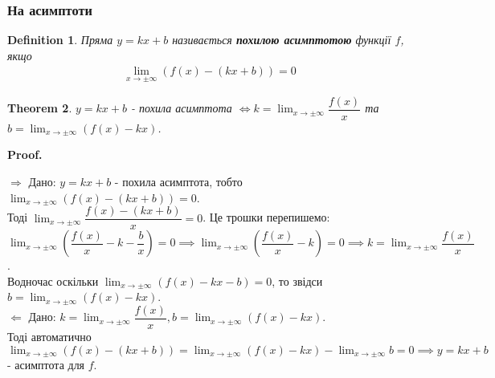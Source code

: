 \documentclass[a4paper, 14pt]{article}
\makeatletter
\def\qed{$\blacksquare$}
\def\rightproof{$\boxed{\Rightarrow}$ }
\def\leftproof{$\boxed{\Leftarrow}$ }
\theoremstyle{theoremdd}
\newtheorem{theorem}{Theorem}[subsection]
\theoremstyle{theoremdd}
\newtheorem{definition}[theorem]{Definition}
\theoremstyle{theoremdd}
\theoremstyle{theoremdd}
\theoremstyle{theoremdd}
\theoremstyle{theoremdd}
\theoremstyle{theoremdd}
\theoremstyle{theoremdd}
\renewenvironment{proof}[1][Proof.\\]{\par
\pushQED{\hfill \qed}%
\normalfont \topsep6\p@\@plus6\p@\relax
\trivlist
\item\relax
{\bfseries
#1\@addpunct{.}}\hspace\labelsep\ignorespaces
}{%
\popQED\endtrivlist\@endpefalse
}
\makeatother
\begin{document}
\subsubsection{На асимптоти}
\begin{definition}
Пряма $y = kx+b$ називається \textbf{похилою асимптотою} функції $f$, якщо
\begin{align*}
\lim_{x \to \pm \infty} (f(x) - (kx+b)) = 0
\end{align*}
\end{definition}

\begin{theorem}
$y = kx+b$ - похила асимптота $\iff  k = \displaystyle\lim_{x \to \pm \infty} \dfrac{f(x)}{x}$ та $b = \displaystyle\lim_{x \to \pm \infty} (f(x) - kx)$.
\end{theorem}

\begin{proof}
\rightproof Дано: $y = kx+b$ - похила асимптота, тобто $\displaystyle\lim_{x \to \pm \infty} (f(x) - (kx+b)) = 0$.\\
Тоді $\displaystyle\lim_{x \to \pm \infty} \dfrac{f(x)-(kx+b)}{x} = 0$. Це трошки перепишемо:\\
$\displaystyle\lim_{x \to \pm \infty} \left( \dfrac{f(x)}{x} - k - \dfrac{b}{x} \right) = 0 \implies \lim_{x \to \pm \infty} \left( \dfrac{f(x)}{x} - k \right) = 0 \implies k =\lim_{x \to \pm \infty} \dfrac{f(x)}{x}$.\\
Водночас оскільки $\displaystyle\lim_{x \to \pm \infty} (f(x)-kx-b) = 0$, то звідси $b = \displaystyle\lim_{x \to \pm \infty} (f(x)-kx)$.
\bigskip \\
\leftproof Дано: $k = \displaystyle\lim_{x \to \pm \infty} \dfrac{f(x)}{x}, b = \lim_{x \to \pm \infty} (f(x)-kx)$.\\
Тоді автоматично $\displaystyle\lim_{x \to \pm \infty} (f(x)-(kx+b)) = \lim_{x \to \pm \infty} (f(x)-kx) - \lim_{x \to \pm \infty} b = 0 \implies y =kx+b$ - асимптота для $f$.
\end{proof}
\end{document}
